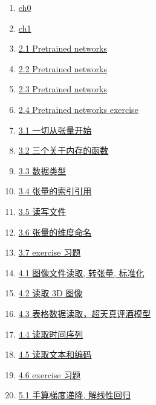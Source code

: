 \documentclass[11pt]{article}
\begin{document}
\begin{enumerate}
	\item \href{https://mp.weixin.qq.com/s/cUuTYKWo6SB2EMqSHGo0BQ}{ch0}	%
	\item \href{https://mp.weixin.qq.com/s/uJAvG8qmZBIKUHUkCzMdDg}{ch1}	%
	\item \href{https://mp.weixin.qq.com/s/ay522YZNJ15wyjcwLGf3cA}{2.1 Pretrained networks}	%
	\item \href{https://mp.weixin.qq.com/s/dUHzCriNFep4HvwjeDCy-A}{2.2 Pretrained networks}	%
	\item \href{https://mp.weixin.qq.com/s/yOL6ihoa01JpU0K3LaPQOg}{2.3 Pretrained networks}	%
	\item \href{https://mp.weixin.qq.com/s/bbl96mA31YYauQWmXRTW3A}{2.4 Pretrained networks exercise}	%
	\item \href{https://mp.weixin.qq.com/s/RkoyWy9ul7FMVMJ9G0MZqA}{3.1 一切从张量开始}	%
	\item \href{https://mp.weixin.qq.com/s/d88KyZeRb84xeu3o9MOF7g}{3.2 三个关于内存的函数}	%
	\item \href{https://mp.weixin.qq.com/s/Ess4ISXREbBOEhauK5hXlQ}{3.3 数据类型}	%
	\item \href{https://mp.weixin.qq.com/s/x-C09e4k52Rm_C45KOIhPQ}{3.4 张量的索引引用}	%
	\item \href{https://mp.weixin.qq.com/s/2VNR9Tkhkpv0QohMH7tw_A}{3.5 读写文件}	%
	\item \href{https://mp.weixin.qq.com/s/YBjwu2C83BD-nFpTZ6a5iw}{3.6 张量的维度命名}	%
	\item \href{https://mp.weixin.qq.com/s/PjfZ2NQcBZ1pb6bjU5SFnQ}{3.7 exercise 习题}	%
	\item \href{https://mp.weixin.qq.com/s/6Zr57a7Y12dTeMSLQHdeVg}{4.1 图像文件读取, 转张量, 标准化}	%
	\item \href{https://mp.weixin.qq.com/s/BLt4nOj9j7xSHMER2vJNxg}{4.2 读取 3D 图像}	%
	\item \href{https://mp.weixin.qq.com/s/JEIy-nk4hYw4cLtlKbwrVg}{4.3 表格数据读取，超天真评酒模型}	%
	\item \href{https://mp.weixin.qq.com/s/FdtFEyBZBv7qE9RRbR0wlg}{4.4 读取时间序列}	%
	\item \href{https://mp.weixin.qq.com/s/QONqTxujiCUMmsq-AGbtNg}{4.5 读取文本和编码}	%
	\item \href{https://mp.weixin.qq.com/s/z4F4pyPWw_RAKHVmAMEVGg}{4.6 exercise 习题}	%
	\item \href{https://mp.weixin.qq.com/s/fPJ5to-eRDArbBEmmYxI1Q}{5.1 手算梯度递降, 解线性回归}	%

\end{enumerate}
\end{document}
